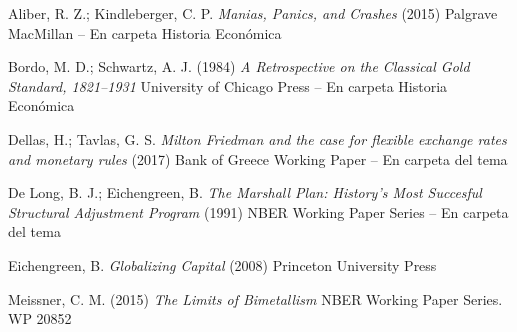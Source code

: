 \documentclass{nuevotema}
\begin{document}
Aliber, R. Z.; Kindleberger, C. P. \textit{Manias, Panics, and Crashes} (2015) Palgrave MacMillan -- En carpeta Historia Económica

Bordo, M. D.; Schwartz, A. J. (1984) \textit{A Retrospective on the Classical Gold Standard, 1821--1931} University of Chicago Press -- En carpeta Historia Económica

Dellas, H.; Tavlas, G. S. \textit{Milton Friedman and the case for flexible exchange rates and monetary rules} (2017) Bank of Greece Working Paper -- En carpeta del tema

De Long, B. J.; Eichengreen, B. \textit{The Marshall Plan: History's Most Succesful Structural Adjustment Program} (1991) NBER Working Paper Series -- En carpeta del tema

Eichengreen, B. \textit{Globalizing Capital} (2008) Princeton University Press

Meissner, C. M. (2015) \textit{The Limits of Bimetallism} NBER Working Paper Series. WP 20852
\end{document}
